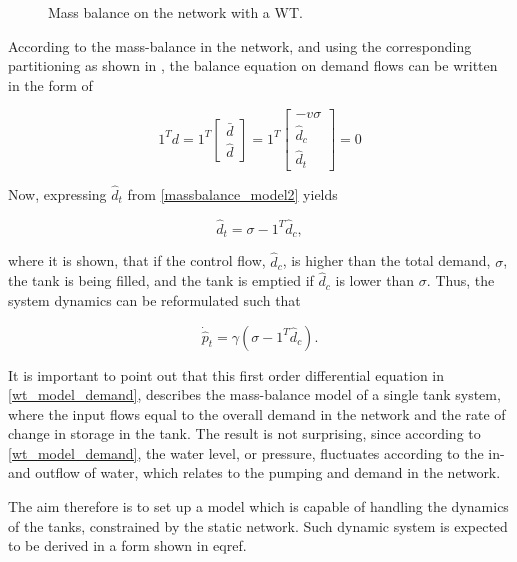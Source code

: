 \begin{figure}[H]
\centering
 
\caption{Mass balance on the network with a WT.}
\label{fig:onenode_system}
\end{figure}

According to the mass-balance in the network, and using the corresponding partitioning as shown in , the balance equation on demand flows can be written in the form of

\begin{equation}
\label{massbalance_model2}
1^Td 
 =
 1^T
\begin{bmatrix} 
\bar{d} \\
\hat{d}
\end{bmatrix}
=
1^T
\begin{bmatrix} 
-v \sigma \\
\hat{d}_c \\
\hat{d}_t 
\end{bmatrix}
=
0
\end{equation}

Now, expressing $\hat{d}_t $ from \eqref{massbalance_model2} yields

\begin{equation}
\label{massbalance_model2_1}
\hat{d}_t  = \sigma - 1^T \hat{d}_c,
\end{equation}

where it is shown, that if the control flow, $\hat{d}_c$, is higher than the total demand, $\sigma$, the tank is being filled, and the tank is emptied if $\hat{d}_c$ is lower than $\sigma$. Thus, the system dynamics can be reformulated such that

\begin{equation}
\label{wt_model_demand}
\dot{\hat{p}}_t = \gamma (\sigma - 1^T \hat{d}_c).
\end{equation}

It is important to point out that this first order differential equation in \eqref{wt_model_demand}, describes the mass-balance model of a single tank system, where the input flows equal to the overall demand in the network and the rate of change in storage in the tank. The result is not surprising, since according to \eqref{wt_model_demand}, the water level, or pressure, fluctuates according to the in- and outflow of water, which relates to the pumping and demand in the network. 

The aim therefore is to set up a model which is capable of handling the dynamics of the tanks, constrained by the static network. Such dynamic system is expected to be derived in a form shown in eqref. 

